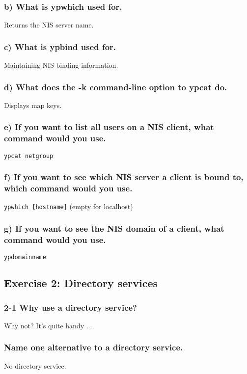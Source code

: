 \subsubsection{b) What is ypwhich used for.}
Returns the NIS server name.

\subsubsection{c) What is ypbind used for.}
Maintaining NIS binding information.

\subsubsection{d) What does the -k command-line option to ypcat do.}
Displays map keys.

\subsubsection{e) If you want to list all users on a NIS client, what command would you use.}
\verb=ypcat netgroup= %

\subsubsection{f) If you want to see which NIS server a client is bound to, which command would you use.}
\verb=ypwhich [hostname]= (empty for localhost)

\subsubsection{g) If you want to see the NIS domain of a client, what command would you use.}
\verb=ypdomainname= %


\subsection{Exercise 2: Directory services}
\subsubsection{2-1 Why use a directory service?}
Why not? It's quite handy ...

\subsubsection{ Name one alternative to a directory service.}
No directory service.

